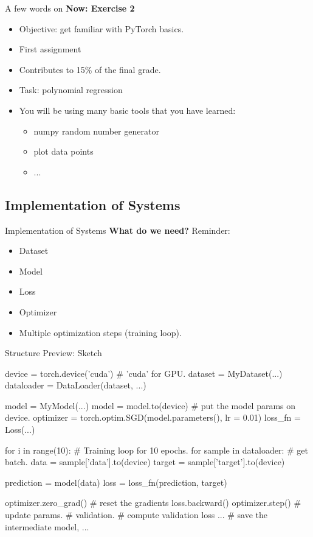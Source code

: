 \begin{frame}{A few words on }
\textbf{Now: Exercise 2}
\begin{itemize}
\item Objective: get familiar with PyTorch basics.
\end{itemize}
\vsp
\vsp
{}
\begin{itemize}
\item First assignment
\item Contributes to 15\% of the final grade.
\item Task: polynomial regression
\item You will be using many basic tools that you have learned:
\begin{itemize}
\item numpy random number generator
\item plot data points
\item ...
\end{itemize}
\end{itemize}
\end{frame}
\subsection{Implementation of Systems}
\begin{frame}{Implementation of Systems}
\textbf{What do we need?} Reminder:
\vsp
\begin{itemize}
\item Dataset
\item Model
\item Loss
\item Optimizer
\item Multiple optimization steps (training loop).
\end{itemize}
\end{frame}

\begin{frame}[fragile]{Structure Preview: Sketch}
\vspace{-6mm}
\begin{python}
device = torch.device('cuda')  # 'cuda' for GPU.
dataset = MyDataset(...)
dataloader = DataLoader(dataset, ...) 

model = MyModel(...)
model = model.to(device)  # put the model params on device.
optimizer = torch.optim.SGD(model.parameters(), lr = 0.01)
loss_fn = Loss(...)

for i in range(10):  # Training loop for 10 epochs.
    for sample in dataloader:  # get batch.
        data = sample['data'].to(device)
        target = sample['target'].to(device)

        prediction = model(data)
        loss = loss_fn(prediction, target)

        optimizer.zero_grad() # reset the gradients
        loss.backward()
        optimizer.step()  # update params.
    # validation.
        # compute validation loss ...
        # save the intermediate model, ...
\end{python}
\end{frame}

